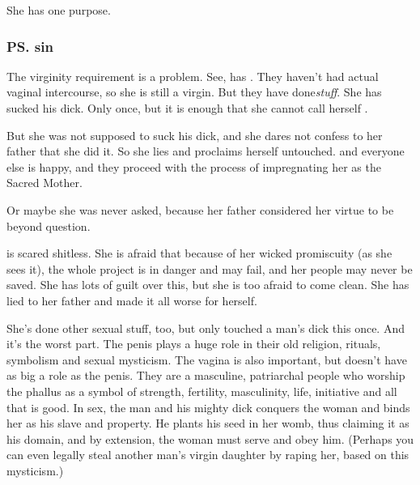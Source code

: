 She has one purpose. 






\subsubsection{\ps{\Ilu}{} sin}
The virginity requirement is a problem. See, \Ilu{} has . They haven't had actual vaginal intercourse, so she is still a virgin. But they have done\prikker \emph{stuff}. She has sucked his dick. Only once, but it is enough that she cannot call herself .

But she was not supposed to suck his dick, and she dares not confess to her father that she did it. So she lies and proclaims herself untouched. \Semiza{} and everyone else is happy, and they proceed with the process of impregnating her as the Sacred Mother. 

Or maybe she was never asked, because her father considered her virtue to be beyond question. 

\Ilu{} is scared shitless. She is afraid that because of her wicked promiscuity (as she sees it), the whole project is in danger and may fail, and her people may never be saved. She has lots of guilt over this, but she is too afraid to come clean. She has lied to her father and made it all worse for herself. 

She's done other sexual stuff, too, but only touched a man's dick this once. And it's the worst part. The penis plays a huge role in their old religion, rituals, symbolism and sexual mysticism. The vagina is also important, but doesn't have as big a role as the penis. They are a masculine, patriarchal people who worship the phallus as a symbol of strength, fertility, masculinity, life, initiative and all that is good. In sex, the man and his mighty dick conquers the woman and binds her as his slave and property. He plants his seed in her womb, thus claiming it as his domain, and by extension, the woman must serve and obey him. (Perhaps you can even legally steal another man's virgin daughter by raping her, based on this mysticism.)





